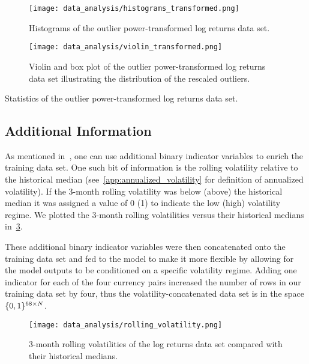 \begin{figure}[!htb]
    \begin{center}
        \texttt{[image: data\_analysis/histograms\_transformed.png]}
    \end{center}
    \caption{Histograms of the outlier power-transformed log returns data set.}
    \label{fig:histograms_transformed}
\end{figure}
\begin{figure}[!htb]
    \begin{center}
        \texttt{[image: data\_analysis/violin\_transformed.png]}
    \end{center}
    \caption{Violin and box plot of the outlier power-transformed log returns data set illustrating the distribution of the rescaled outliers.}
    \label{fig:violin_transformed}
\end{figure}
\begin{table}[!htb]
    \centering
    \begin{adjustbox}{max width=\textwidth}
        
    \end{adjustbox}
    \caption{Statistics of the outlier power-transformed log returns data set.}
    \label{tbl:data_log_returns_transformed_stats}
\end{table}

\subsection{Additional Information}
As mentioned in~\cite{kondratyev_2019}, one can use additional binary indicator variables to enrich the training data set.
One such bit of information is the rolling volatility relative to the historical median (see~\cref{app:annualized_volatility} for definition of annualized volatility).
If the 3-month rolling volatility was below (above) the historical median it was assigned a value of 0 (1) to indicate the low (high) volatility regime.
We plotted the 3-month rolling volatilities versus their historical medians in~\cref{fig:rolling_volatility}.

These additional binary indicator variables were then concatenated onto the training data set and fed to the model to make it more flexible by allowing for the model outputs to be conditioned on a specific volatility regime.
Adding one indicator for each of the four currency pairs increased the number of rows in our training data set by four, thus the volatility-concatenated data set is in the space \( \{0,1\}^{68 \times N} \).

\begin{figure}[!htb]
    \begin{center}
        \texttt{[image: data\_analysis/rolling\_volatility.png]}
    \end{center}
    \caption{3-month rolling volatilities of the log returns data set compared with their historical medians.}
    \label{fig:rolling_volatility}
\end{figure}
